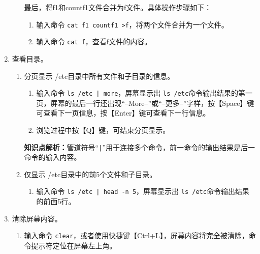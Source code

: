 \begin{enumerate}
\begin{enumerate}
    最后，将f1和countf1文件合并为f文件。具体操作步骤如下：
    \begin{enumerate}
      \item 输入命令 \verb|cat f1 countf1 >f|，将两个文件合并为一个文件。
      \item 输入命令 \verb|cat f|，查看f文件的内容。
    \end{enumerate}
    \end{enumerate}
  \item 查看目录。
    \begin{enumerate}
      \item 分页显示 /etc目录中所有文件和子目录的信息。
    \begin{enumerate}
      \item 输入命令 \verb=ls /etc | more=，屏幕显示出 \verb|ls /etc|命令输出结果的第一页，屏幕的最后一行还出现“--More--”或“--更多--”字样，按【Space】键可查看下一页信息，按【Enter】键可查看下一行信息。
      \item 浏览过程中按【Q】键，可结束分页显示。
    \end{enumerate}
    \textbf{知识点解析：}管道符号“\verb=|=”用于连接多个命令，前一命令的输出结果是后一命令的输入内容。
  \item 仅显示 /etc目录中的前5个文件和子目录。
    \begin{enumerate}
      \item 输入命令 \verb=ls /etc | head -n 5=，屏幕显示出 \verb|ls /etc|命令输出结果的前面5行。
    \end{enumerate}
    \end{enumerate}
  \item 清除屏幕内容。
    \begin{enumerate}
      \item 输入命令 \verb|clear|，或者使用快捷键【Ctrl+L】，屏幕内容将完全被清除，命令提示符定位在屏幕左上角。
    \end{enumerate}
\end{enumerate}

